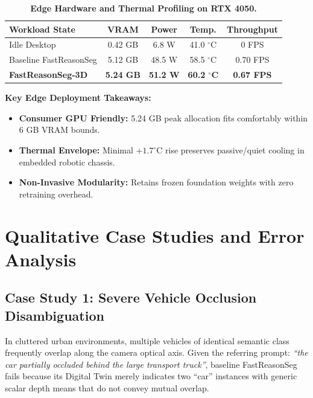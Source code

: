\documentclass[10pt,twocolumn,letterpaper]{article}
\begin{document}
\begin{table}[t]
\begin{minipage}[t]{0.50\textwidth}
\end{minipage}
\hfill
\begin{minipage}[t]{0.46\textwidth}
\centering
\footnotesize
\caption{\textbf{Edge Hardware and Thermal Profiling on RTX 4050.}}
\label{tab:thermal}
\begin{tabular*}{\linewidth}{@{\extracolsep{\fill}}lcccc}
\toprule
\textbf{Workload State} & \textbf{VRAM} & \textbf{Power} & \textbf{Temp.} & \textbf{Throughput} \\
\midrule
Idle Desktop & 0.42 GB & 6.8 W & 41.0 $^\circ$C & 0 FPS \\
Baseline FastReasonSeg & 5.12 GB & 48.5 W & 58.5 $^\circ$C & 0.70 FPS \\
\textbf{FastReasonSeg-3D} & \textbf{5.24 GB} & \textbf{51.2 W} & \textbf{60.2 $^\circ$C} & \textbf{0.67 FPS} \\
\bottomrule
\end{tabular*}
\vspace{0.6em}
\raggedright
\scriptsize
\textbf{Key Edge Deployment Takeaways:}
\begin{itemize}[leftmargin=*,itemsep=1pt]
\item \textbf{Consumer GPU Friendly:} 5.24 GB peak allocation fits comfortably within 6 GB VRAM bounds.
\item \textbf{Thermal Envelope:} Minimal $+1.7^\circ\text{C}$ rise preserves passive/quiet cooling in embedded robotic chassis.
\item \textbf{Non-Invasive Modularity:} Retains frozen foundation weights with zero retraining overhead.
\end{itemize}
\end{minipage}
\end{table}

\section{Qualitative Case Studies and Error Analysis}
\label{sec:qualitative}

\subsection{Case Study 1: Severe Vehicle Occlusion Disambiguation}
In cluttered urban environments, multiple vehicles of identical semantic class frequently overlap along the camera optical axis. Given the referring prompt: \textit{``the car partially occluded behind the large transport truck''}, baseline FastReasonSeg fails because its Digital Twin merely indicates two ``car'' instances with generic scalar depth means that do not convey mutual overlap. 
\end{document}
